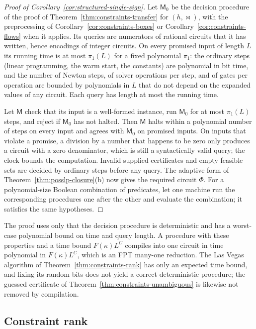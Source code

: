 \begin{proof}[Proof of Corollary~\ref{cor:structured-single-sign}]
Let $\mathsf M_0$ be the decision procedure of the proof of
Theorem~\ref{thm:constraints-transfer} for $(h,\bowtie)$, with the
preprocessing of Corollary~\ref{cor:constraints-boxes} or
Corollary~\ref{cor:constraints-flows} when it applies. Its queries are
numerators of rational circuits that it has written, hence encodings of
integer circuits. On every promised input of length $L$ its running time is at
most $\pi_1(L)$ for a fixed polynomial $\pi_1$: the ordinary steps (linear
programming, the warm start, the constants) are polynomial in bit time, and
the number of Newton steps, of solver operations per step, and of gates per
operation are bounded by polynomials in $L$ that do not depend on the expanded
values of any circuit. Each query has length at most the running time.

Let $\mathsf M$ check that its input is a well-formed instance, run
$\mathsf M_0$ for at most $\pi_1(L)$ steps, and reject if $\mathsf M_0$ has not
halted. Then $\mathsf M$ halts within a polynomial number of steps on every
input and agrees with $\mathsf M_0$ on promised inputs. On inputs that violate
a promise, a division by a number that happens to be zero only produces a
circuit with a zero denominator, which is still a syntactically valid query; the
clock bounds the computation. Invalid supplied certificates and empty feasible
sets are decided by ordinary steps before any query. The adaptive form of
Theorem~\ref{thm:posslp-closure}(b) now gives the required circuit $\Phi$. For a
polynomial-size Boolean combination of predicates, let one machine run the
corresponding procedures one after the other and evaluate the combination; it
satisfies the same hypotheses.
\end{proof}

The proof uses only that the decision procedure is deterministic and has a
worst-case polynomial bound on time and query length. A procedure with these
properties and a time bound $F(\kappa)L^C$ compiles into one circuit in time
polynomial in $F(\kappa)L^C$, which is an FPT many-one reduction. The Las Vegas
algorithm of Theorem~\ref{thm:constraints-rank} has only an expected time
bound, and fixing its random bits does not yield a correct deterministic
procedure; the guessed certificate of Theorem~\ref{thm:constraints-unambiguous}
is likewise not removed by compilation.

\subsection{Constraint rank}
\label{app:constraints-rank}

